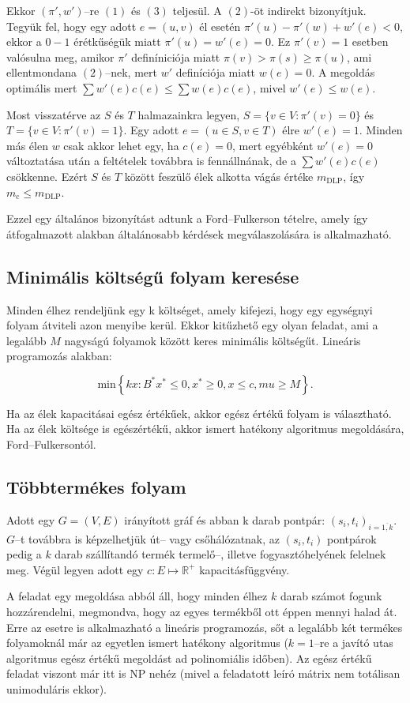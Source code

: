 Ekkor $(\pi',w')$--re $(1)$ és $(3)$ teljesül. A $(2)$-öt indirekt bizonyítjuk.
Tegyük fel, hogy egy adott $e=(u,v)$ él esetén $\pi'(u)-\pi'(w)+w'(e)<0$, ekkor
a $0-1$ érétkűségük miatt $\pi'(u)=w'(e)=0$. Ez $\pi'(v)=1$ esetben valósulna
meg, amikor $\pi'$ definíniciója miatt $\pi(v) > \pi(s) \geq \pi(u)$, ami
ellentmondana $(2)$--nek, mert $w'$ definíciója miatt $w(e)=0$. A megoldás
optimális mert $\sum w'(e)c(e) \leq \sum w(e)c(e)$, mivel $w'(e) \leq w(e)$.

Most visszatérve az $S$ és $T$ halmazainkra legyen, $S=\{v \in V: \pi'(v)=0\} $
és $T=\{v \in V: \pi'(v)=1\}$. Egy adott $e=(u \in S, v \in T)$ élre $w'(e)=1$.
Minden más élen $w$ csak akkor lehet egy, ha $c(e)=0$, mert egyébként $w'(e)=0$
változtatása után a feltételek továbbra is fennállnának, de a $\sum w'(e)c(e)$
csökkenne. Ezért $S$ és $T$ között feszülő élek alkotta vágás értéke
$m_{\mbox{DLP}}$, így $m_{\mbox{c}} \leq m_{\mbox{DLP}}$.

Ezzel egy általános bizonyítást adtunk a Ford--Fulkerson tételre, amely így
átfogalmazott alakban általánosabb kérdések megválaszolására is alkalmazható.

\subsection{Minimális költségű folyam keresése}

Minden élhez rendeljünk egy k költséget, amely kifejezi, hogy egy egységnyi folyam
átviteli azon menyibe kerül. Ekkor kitűzhető egy olyan feladat, ami a legalább $M$
nagyságú folyamok között keres minimális költségűt. Lineáris programozás alakban:

\[ \mbox{min} \left\{kx: B^*x^* \leq 0, x^* \geq 0, x \leq c,mu \geq M \right\}. \]

Ha az élek kapacitásai egész értékűek, akkor egész értékű folyam is választható.
Ha az élek költsége is egészértékű, akkor ismert hatékony algoritmus megoldására,
Ford--Fulkersontól.

\subsection{Többtermékes folyam}

Adott egy $G=(V,E)$ irányított gráf és abban k darab pontpár:
$(s_i,t_i)_{i = \overline{1,k}}$. $G$--t továbbra is képzelhetjük út-- vagy
csőhálózatnak, az $(s_i, t_i)$ pontpárok pedig a $k$ darab szállítandó termék
termelő--, illetve fogyasztóhelyének felelnek meg. Végül legyen adott egy $c:E
\mapsto \mathbb{R}^+$ kapacitásfüggvény.

A feladat egy megoldása abból áll, hogy minden élhez $k$ darab számot fogunk
hozzárendelni, megmondva, hogy az egyes termékből ott éppen mennyi halad át.
Erre az esetre is alkalmazható a lineáris programozás, sőt a legalább két
termékes folyamoknál már az egyetlen ismert hatékony algoritmus ($k=1$--re a
javító utas algoritmus egész értékű megoldást ad polinomiális időben). Az egész
értékű feladat viszont már itt is NP nehéz (mivel a feladatott leíró mátrix nem
totálisan unimoduláris ekkor).
